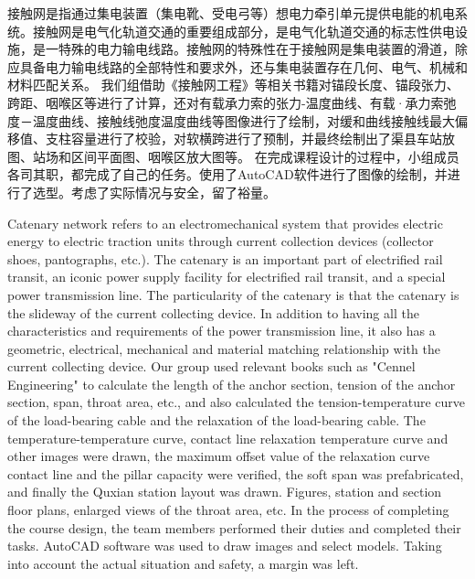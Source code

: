\begin{cnabstract}
接触网是指通过集电装置（集电靴、受电弓等）想电力牵引单元提供电能的机电系统。接触网是电气化轨道交通的重要组成部分，是电气化轨道交通的标志性供电设施，是一特殊的电力输电线路。接触网的特殊性在于接触网是集电装置的滑道，除应具备电力输电线路的全部特性和要求外，还与集电装置存在几何、电气、机械和材料匹配关系。
我们组借助《接触网工程》等相关书籍对锚段长度、锚段张力、跨距、咽喉区等进行了计算，还对有载承力索的张力-温度曲线、有载·承力索弛度－温度曲线、接触线弛度温度曲线等图像进行了绘制，对缓和曲线接触线最大偏移值、支柱容量进行了校验，对软横跨进行了预制，并最终绘制出了渠县车站放图、站场和区间平面图、咽喉区放大图等。
在完成课程设计的过程中，小组成员各司其职，都完成了自己的任务。使用了AutoCAD软件进行了图像的绘制，并进行了选型。考虑了实际情况与安全，留了裕量。

\end{cnabstract}
\vspace{1em}\par


\begin{enabstract}
Catenary network refers to an electromechanical system that provides electric energy to electric traction units through current collection devices (collector shoes, pantographs, etc.). The catenary is an important part of electrified rail transit, an iconic power supply facility for electrified rail transit, and a special power transmission line. The particularity of the catenary is that the catenary is the slideway of the current collecting device. In addition to having all the characteristics and requirements of the power transmission line, it also has a geometric, electrical, mechanical and material matching relationship with the current collecting device.
Our group used relevant books such as "Cennel Engineering" to calculate the length of the anchor section, tension of the anchor section, span, throat area, etc., and also calculated the tension-temperature curve of the load-bearing cable and the relaxation of the load-bearing cable. The temperature-temperature curve, contact line relaxation temperature curve and other images were drawn, the maximum offset value of the relaxation curve contact line and the pillar capacity were verified, the soft span was prefabricated, and finally the Quxian station layout was drawn. Figures, station and section floor plans, enlarged views of the throat area, etc.
In the process of completing the course design, the team members performed their duties and completed their tasks. AutoCAD software was used to draw images and select models. Taking into account the actual situation and safety, a margin was left.
\end{enabstract}
\vspace{1em}\par

